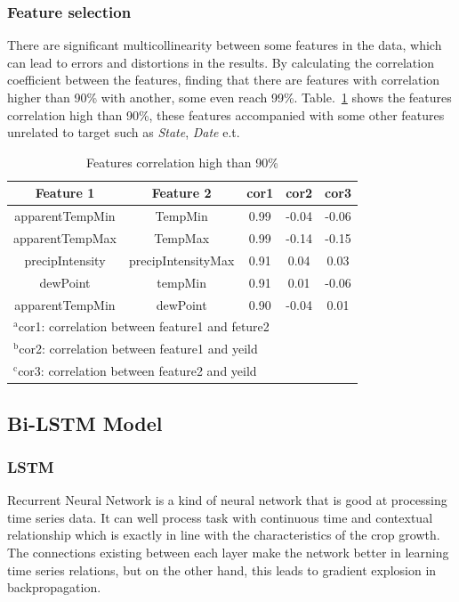\documentclass[conference]{IEEEtran}
\begin{document}
    \subsubsection{Feature selection}
      There are significant multicollinearity between some features in the data, which can lead to errors and distortions in the results\cite{farrar1967multicollinearity}. By calculating the correlation coefficient between the features, finding that there are features with correlation higher than 90\% with another, some even reach 99\%. Table.~\ref{tab:correlation} shows the features correlation high than 90\%, these features accompanied with some other features unrelated to target such as \textit{State}, \textit{Date} e.t. 
      \begin{table}[htbp]
        \caption{Features correlation high than 90\%}
        \begin{center}
          \begin{tabular}{|c|c|c|c|c|}
            \hline
            Feature 1 & Feature 2 & cor1 & cor2 & cor3\\
            \hline
            apparentTempMin & TempMin     & 0.99 & -0.04 & -0.06 \\
            apparentTempMax & TempMax     & 0.99 & -0.14 & -0.15 \\
            precipIntensity & precipIntensityMax & 0.91 & 0.04  & 0.03  \\
            dewPoint & tempMin & 0.91 & 0.01  & -0.06 \\
            apparentTempMin & dewPoint & 0.90 & -0.04 & 0.01 \\
            \hline
            \multicolumn{5}{l}{$^{\mathrm{a}}$cor1: correlation between feature1 and feture2} \\
            \multicolumn{5}{l}{$^{\mathrm{b}}$cor2: correlation between feature1 and yeild} \\ 
            \multicolumn{5}{l}{$^{\mathrm{c}}$cor3: correlation between feature2 and yeild} \\
          \end{tabular}
          \label{tab:correlation}
        \end{center}
      \end{table}




  \subsection{Bi-LSTM Model}
    \subsubsection{LSTM}
      Recurrent Neural Network is a kind of neural network that is good at processing time series data. It can well process task with continuous time and contextual relationship which is exactly in line with the characteristics of the crop growth. The connections existing between each layer make the network better in learning time series relations, but on the other hand, this leads to gradient explosion in backpropagation. \cite{hochreiter1997long}
\end{document}
